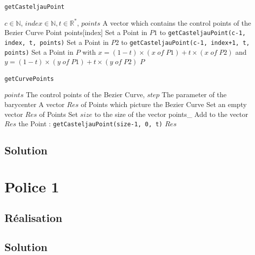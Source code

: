 \documentclass[a4paper, 12pt]{article}
\begin{document}
\begin{algorithm}
	\caption{\texttt{getCasteljauPoint}}
		\begin{algorithmic}[1]
		\Require $c \in \mathbb{N}$, $index \in \mathbb{N}, t \in \mathbb{R}^{*}$, $points$ A vector which contains the control points of the Bezier Curve
		\Ensure Point
			\State \Return points[index] 
		\EndIf
		\State Set a Point in $P1$ to \texttt{getCasteljauPoint(c-1, index, t, points)} 
		\State Set a Point in $P2$ to \texttt{getCasteljauPoint(c-1, index+1, t, points)} 
		\State Set a Point in $P$ with $x = (1-t) \times (x \; of \; P1) + t \times (x \; of \; P2)$ and $y = (1-t) \times (y \; of \; P1) + t \times (y \; of \; P2)$
		\State \Return $P$
		\EndFunction
		\end{algorithmic}
\end{algorithm}

\begin{algorithm}
	\caption{\texttt{getCurvePoints}}
		\begin{algorithmic}[1]
		\Require $points$ The control points of the Bezier Curve, $step$ The parameter of the barycenter
		\Ensure A vector $Res$ of Points which picture the Bezier Curve
		\State Set an empty vector $Res$ of Points
		\State Set $size$ to the size of the vector points\_
			\State Add to the vector $Res$ the Point : \texttt{getCasteljauPoint(size-1, 0, t)} 
		\EndFor
		\State \Return $Res$
		\EndFunction
		\end{algorithmic}
\end{algorithm}
	
	
\subsection{Solution}

\section{Police 1}	
\subsection{Réalisation}
\subsection{Solution}
\end{document}
